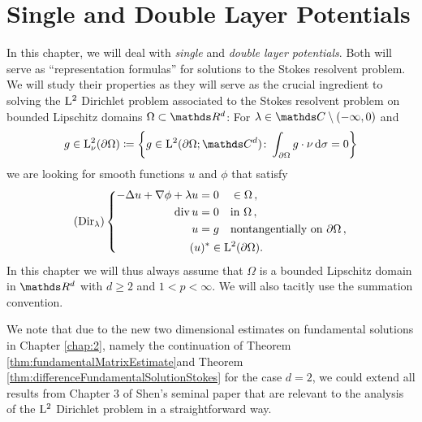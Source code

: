 \chapter{Single and Double Layer Potentials}
\label{chap:3}

In this chapter, we will deal with \emph{single} and \emph{double layer potentials}.
Both will serve as ``representation formulas'' for solutions to the Stokes resolvent problem.
We will study their properties as they will serve as the crucial ingredient to solving the $\mathrm{L}^2$ Dirichlet problem associated to the Stokes resolvent problem on bounded Lipschitz domains $\Omega \subset \R^d$:
For $\lambda \in \C \setminus (-\infty,0)$ and
\begin{align*}
  g \in \Ell^2_\nu(\partial\Omega) \coloneqq \bigg\{g \in \Ell^2(\partial\Omega; \C^d) \colon \int_{\partial\Omega} g \cdot \nu \d \sigma = 0\bigg\}
\end{align*}
we are looking for smooth functions $u$ and $\phi$ that satisfy
\begin{align*}
  (\mathrm{Dir}_\lambda)
  \left\{
  \begin{alignedat}{1}
    -\Delta u + \nabla \phi + \lambda u =&\; 0 \quad\in\Omega\,, \\
    \mathrm{div\,} u =&\; 0 \quad\text{in } \Omega\,, \\ 
    u =&\; g  \quad\text{nontangentially on } \partial\Omega\,, \\
    (u)^* &\in \mathrm{L}^2(\partial\Omega).
  \end{alignedat}
    \right.
\end{align*}
In this chapter we will thus always assume that $\Omega$ is a bounded Lipschitz domain in $\R^d$ with $d \geq 2$ and $1 < p < \infty$.
We will also tacitly use the summation convention.

We note that due to the new two dimensional estimates on fundamental solutions in Chapter \ref{chap:2}, namely the continuation of  Theorem \ref{thm:fundamentalMatrixEstimate}and Theorem \ref{thm:differenceFundamentalSolutionStokes} for the case $d=2$, we could extend all results from Chapter 3 of Shen's seminal paper \cite{Shen2012} that are relevant to the analysis of the $\mathrm{L}^2$ Dirichlet problem in a straightforward way.

